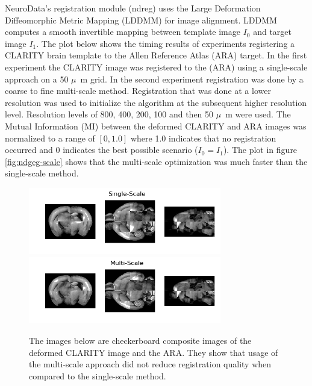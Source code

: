 \documentclass[simplex.tex]{subfiles}
\begin{document}
NeuroData’s registration module (ndreg) uses the Large Deformation
Diffeomorphic Metric Mapping (LDDMM) for image alignment.  LDDMM
computes a smooth invertible mapping between template image $I_0$ and
target image $I_1$. The plot below shows the timing results of experiments
registering a CLARITY brain template to the Allen Reference Atlas (ARA)
target.  In the first experiment the CLARITY image was registered to the
(ARA) using a single-scale approach on a 50 $\mu$~m grid.  In the second
experiment registration was done by a coarse to fine multi-scale method.
Registration that was done at a lower resolution was used to initialize
the algorithm at the subsequent higher resolution level.  Resolution
levels of 800, 400, 200, 100 and then 50 $\mu$~m were used. The Mutual
Information (MI) between the deformed CLARITY and ARA images was
normalized to a range of $[0, 1.0]$ where 1.0 indicates that no
registration occurred and 0 indicates the best possible scenario ($I_0 =
I_1$).  The plot in figure \ref{fig:ndgeg-scale} shows that the multi-scale optimization was much faster
than the single-scale method.


\begin{figure}[h!]
\begin{cframed}
\centering
\includegraphics[width=0.75\textwidth]{./figs/ndreg-single.png}
\includegraphics[width=0.75\textwidth]{./figs/ndreg-multiscale.png}
\label{fig:ndreg-scale}
\caption{
  The images below are checkerboard composite images of the deformed
  CLARITY image and the ARA.  They show that usage of the multi-scale
  approach did not reduce registration quality when compared to the
  single-scale method.
}
\end{cframed}
\end{figure}
\end{document}
